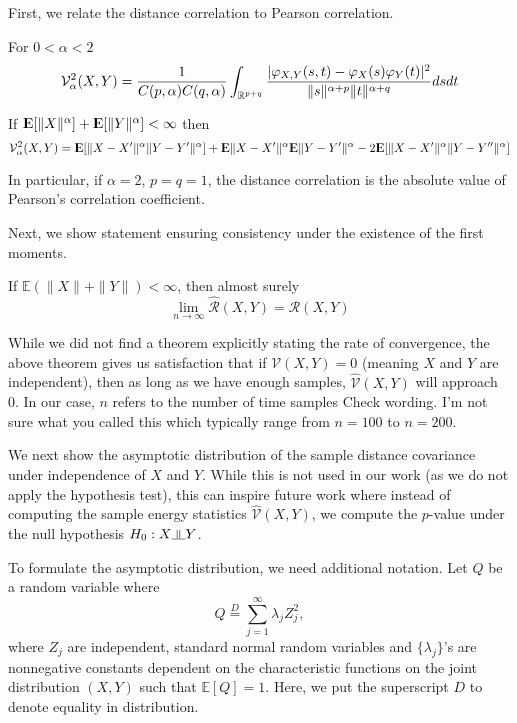 First, we relate the distance correlation to Pearson correlation.

\begin{definition}  
For $0 < \alpha < 2$
$$ \mathcal{V}_\alpha^2 (X,Y)
 = \frac{1}{C(p,\alpha) C(q,\alpha)}
   \int_{\mathbb{R}^{p+q}} \frac{|\varphi_{X,Y}(s,t) - \varphi_X(s) \varphi_Y(t)|^2}
                        {\|s\|^{\alpha + p} \|t\|^{\alpha + q}} ds dt $$
\end{definition}

\begin{prop}
If ${\rm I\kern-.3em E}[\|X\|^\alpha] + {\rm I\kern-.3em E}[\|Y\|^\alpha] < \infty$ then
$$ \mathcal{V}_\alpha^2 (X,Y) = {\rm I\kern-.3em E}[ \|X - X'\|^\alpha \|Y - Y'\|^\alpha ] + {\rm I\kern-.3em E} \|X - X'\|^\alpha {\rm I\kern-.3em E} \|Y - Y'\|^\alpha - 2 {\rm I\kern-.3em E}[ \|X - X'\|^\alpha \|Y - Y''\|^\alpha ]$$

In particular, if $\alpha = 2$, $p = q = 1$, the distance correlation is the absolute value of Pearson's correlation coefficient.
\end{prop}

Next, we show statement ensuring consistency under the existence of the first moments.

\begin{prop}
If $\mathbb{E}(\|X\| +\|Y\|)< \infty$, then almost surely
\[
\lim_{n\rightarrow\infty}\widehat{\mathcal{R}}(X,Y) = \mathcal{R}(X,Y)
\]
\end{prop}

While we did not find a theorem explicitly stating the rate of convergence, the above theorem
gives us satisfaction that if $ \mathcal{V}(X,Y)=0$ (meaning $X$ and $Y$ are independent), then 
as long as we have enough samples, $\widehat{\mathcal{V}}(X,Y) $ will approach 0. In our case, $n$
refers to the number of time samples {\color{red}Check wording. I'm not sure what you called this} which
typically range from $n=100$ to $n=200$.

We next show the asymptotic distribution of the sample distance covariance under independence of $X$ and $Y$.
While this is not used in our work (as we do not apply the hypothesis test), this can inspire future work
where instead of computing the sample energy statistics $\widehat{\mathcal{V}}(X,Y)$, we compute the $p$-value
under the null hypothesis $H_0: X \indep Y$.

To formulate the asymptotic distribution, we need additional notation. Let $Q$ be a random variable where
\[
Q \overset{D}{=} \sum_{j=1}^{\infty}\lambda_j Z^2_j,
\]
where $Z_j$ are independent, standard normal random variables and $\{\lambda_j\}$'s are nonnegative constants
dependent on the characteristic functions on the joint distribution $(X,Y)$ such that $\mathbb{E}[Q] = 1$.
Here, we put the superscript $D$ to denote equality in distribution.

